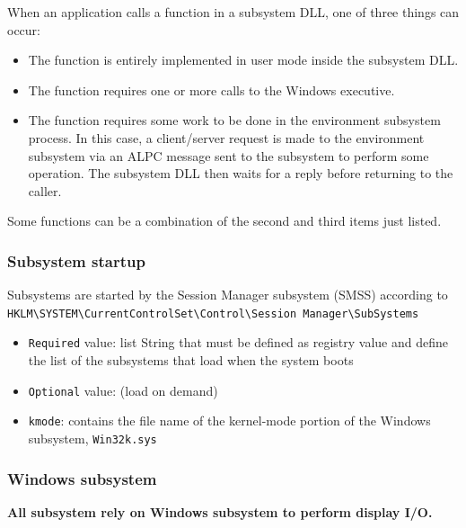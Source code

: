 When an application calls a function in a subsystem DLL, one of three things can occur:
\begin{itemize}
    \item The function is entirely implemented in user mode inside the subsystem DLL.
    \item The function requires one or more calls to the Windows executive.
    \item The function requires some work to be done in the environment subsystem process. In this case, a client/server request is made to the environment subsystem via an ALPC message sent to the subsystem to perform some operation. The subsystem DLL then waits for a reply before returning to the caller.
\end{itemize}

Some functions can be a combination of the second and third items just listed.

\subsubsection{Subsystem startup}
Subsystems are started by the Session Manager subsystem (SMSS) according to \verb+HKLM\SYSTEM\CurrentControlSet\Control\Session Manager\SubSystems+ 
\begin{itemize}
    \item \verb+Required+ value: list String that must be defined as registry value and define the list of the subsystems that load when the system boots
    \item \verb+Optional+ value: (load on demand) 
    \item \verb+kmode+: contains the file name of the kernel-mode portion of the Windows subsystem, \verb+Win32k.sys+
\end{itemize}

\subsubsection{Windows subsystem}

{\bf All subsystem rely on Windows subsystem to perform display I/O.}

